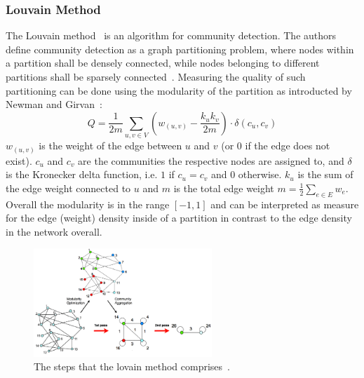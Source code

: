             \subsubsection*{Louvain Method}
                The Louvain method~\autocite{blondel2008fast} is an algorithm for community detection. 
                The authors define community detection as a graph partitioning problem, where nodes within a partition shall be densely connected, while nodes belonging to different partitions shall be sparsely connected~\autocite{blondel2008fast}.
                Measuring the quality of such partitioning can be done using the modularity of the partition as introducted by Newman and Girvan~\autocite{girvan2002community}:
                \[ Q = \frac{1}{2m} \sum_{u,v \in V} \left( w_{(u, v)} - \frac{k_u k_v}{2m} \right) \cdot \delta (c_u, c_v) \]
                $w_{(u,v)}$ is the weight of the edge between $u$ and $v$ (or $0$ if the edge does not exist). 
                $c_u$ and $c_v$ are the communities the respective nodes are assigned to, and $\delta$ is the Kronecker delta function, i.e. $1$ if $c_u = c_v$ and $0$ otherwise. 
                $k_u$ is the sum of the edge weight connected to $u$ and $m$ is the total edge weight $m = \frac{1}{2} \sum_{e \in E} w_e$.
                Overall the modularity is in the range $[-1, 1]$ and can be interpreted as measure for the edge (weight) density inside of a partition in contrast to the edge density in the network overall.
                
                \begin{figure}[htp]
                    \begin{center}
                        \includegraphics[keepaspectratio,width=0.6\textwidth]{img/03-graphs/louvain.png}
                    \end{center}
                    \caption{The steps that the lovain method comprises~\autocite{blondel2008fast}.} 
                    \label{louvain-fig}
                \end{figure}
                
